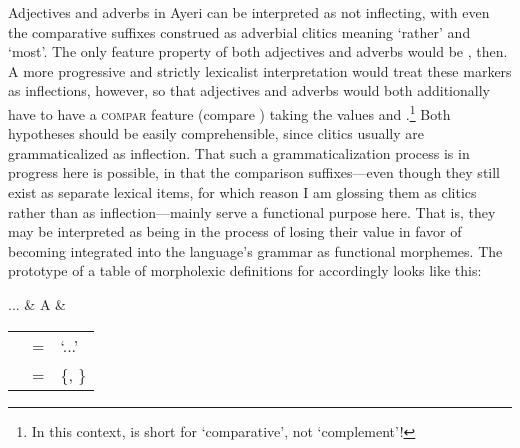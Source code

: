 Adjectives and adverbs in Ayeri can be interpreted as not inflecting, with even
the comparative suffixes construed as adverbial clitics meaning `rather' and
`most'. The only feature property of both adjectives and adverbs would be 
\Pred{}, then. A more progressive and strictly lexicalist interpretation would
treat these markers as inflections, however, so that adjectives and adverbs 
would both additionally have to have a \textsc{compar} feature (compare 
\cite[Feature Table]{pargram}) taking the values \Comp{} and \Supl{}.\footnote{%
In this context, \Comp{} is short for `comparative', not `complement'!} Both
hypotheses should be easily comprehensible, since clitics usually are 
grammaticalized as inflection. That such a grammaticalization process is in
progress here is possible, in that the comparison suffixes---even though they
still exist as separate lexical items, for which reason I am glossing them as
clitics rather than as inflection---mainly serve a functional purpose here.
That is, they may be interpreted as being in the process of losing their 
\Pred{} value in favor of becoming integrated into the language's grammar as
functional morphemes. The prototype of a table of morpholexic definitions for 
 accordingly looks like this:

\ex \begin{tabu}[t] {}
	...
		& A
		& \begin{tabular}[t]{l l l}
			\ups{\Pred} & = & `...' \\
			\ups{\Compar} & = & \{\Comp{}, \Supl{}\} \\
		\end{tabular}
	\end{tabu}

\xe

